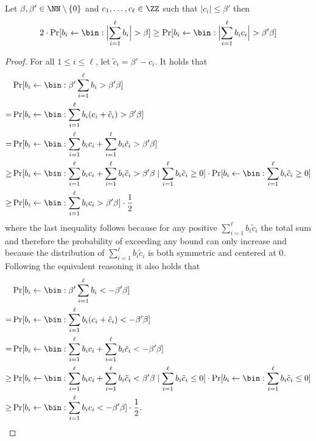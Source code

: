 \begin{lemma}
  Let $\beta,\beta'\in\NN\setminus\{0\}$ and $c_1,\dots,c_\ell \in \ZZ$ such that $|c_i|\leq\beta'$ then
  \[
    2\cdot\Pr[b_i \gets \bin : \Bigl|\sum_{i=1}^\ell b_i\Bigr| > \beta] \geq \Pr[b_i \gets \bin : \Bigl|\sum_{i=1}^\ell b_i c_i\Bigr| > \beta'\beta]
  \]
\end{lemma}
\begin{proof}
  For all $1\leq i \leq \ell$, let $\tilde{c}_i = \beta' - c_i$.
  It holds that
  \begin{align*}
    &\Pr[b_i \gets \bin : \beta'\sum_{i=1}^\ell b_i > \beta'\beta]\\
    =&\Pr[b_i \gets \bin : \sum_{i=1}^\ell b_i (c_i+\tilde{c}_i) > \beta'\beta]\\
    =&\Pr[b_i \gets \bin : \sum_{i=1}^\ell b_i c_i + \sum_{i=1}^\ell b_i \tilde{c}_i > \beta'\beta]\\
    \geq&\Pr[b_i \gets \bin : \sum_{i=1}^\ell b_i c_i + \sum_{i=1}^\ell b_i \tilde{c}_i > \beta'\beta \mid \sum_{i=1}^\ell b_i \tilde{c}_i \geq 0] \cdot \Pr[b_i \gets \bin : \sum_{i=1}^\ell b_i \tilde{c}_i \geq 0]\\
    \geq& \Pr[b_i \gets \bin : \sum_{i=1}^\ell b_i c_i > \beta'\beta]\cdot \frac{1}{2}
  \end{align*}
  where the last inequality follows because for any positive $\sum_{i=1}^\ell b_i \tilde{c}_i$ the total sum and therefore the probability of exceeding any bound can only increase and because the distribution of $\sum_{i=1}^\ell b_i \tilde{c}_i$ is both symmetric and centered at $0$.
  Following the equivalent reasoning it also holds that
  \begin{align*}
    &\Pr[b_i \gets \bin : \beta'\sum_{i=1}^\ell b_i < -\beta'\beta]\\
    =&\Pr[b_i \gets \bin : \sum_{i=1}^\ell b_i (c_i+\tilde{c}_i) < -\beta'\beta]\\
    =&\Pr[b_i \gets \bin : \sum_{i=1}^\ell b_i c_i + \sum_{i=1}^\ell b_i \tilde{c}_i < -\beta'\beta]\\
    \geq&\Pr[b_i \gets \bin : \sum_{i=1}^\ell b_i c_i + \sum_{i=1}^\ell b_i \tilde{c}_i < \beta'\beta \mid \sum_{i=1}^\ell b_i \tilde{c}_i \leq 0] \cdot \Pr[b_i \gets \bin : \sum_{i=1}^\ell b_i \tilde{c}_i \leq 0]\\
    \geq& \Pr[b_i \gets \bin : \sum_{i=1}^\ell b_i c_i < -\beta'\beta]\cdot \frac{1}{2}.
  \end{align*}
  

\end{proof}
